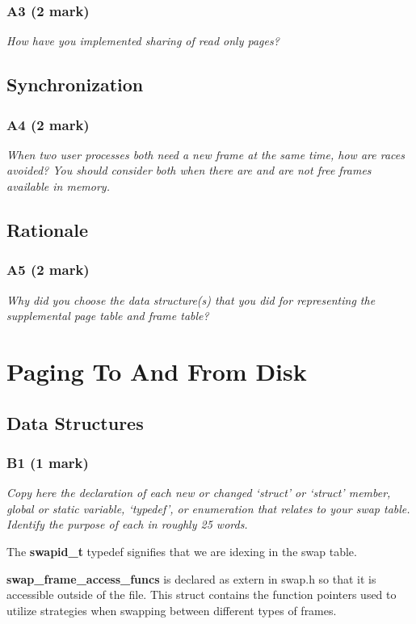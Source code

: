 \documentclass{report}
\newcommand{\question}[1]{\textit{#1} \ }
\newcommand{\file}[1]{\textcolor{YellowGreen}{\textbf{#1}}}
\newcommand{\var}[1]{\textcolor{RoyalPurple}{\textbf{#1}}}
\newcommand{\pintoscode}[4]{}
\newcommand{\pintosfile}[3]{\pintoscode{#1}{#2}{\file{#3}}{#3}}
\begin{document}
			\subsubsection*{A3 (2 mark)}
				\question{How have you implemented sharing of read only pages?}
			
		\subsection*{Synchronization}
			\subsubsection*{A4 (2 mark)}
				\question{When two user processes both need a new frame at 
				the same time, how are races avoided? You should consider both 
				when there are and are not free frames available in memory.}
			
		\subsection*{Rationale}
			\subsubsection*{A5 (2 mark)}
				\question{Why did you choose the data structure(s) that you did for 
				representing the supplemental page table and frame table?}
				
	\section*{Paging To And From Disk}
		\subsection*{Data Structures}
			\subsubsection*{B1 (1 mark)}
				\question{Copy here the declaration of each new or changed `struct' or
				`struct' member, global or static variable, `typedef', or enumeration 
				that relates to your swap table. Identify the purpose of each in roughly
				25 words.}
		
		\pintosfile{9}{9}{swap.h}
			The \var{swapid\_t} typedef signifies that we are idexing in the
			swap table.
		
		\pintosfile{11}{11}{swap.h}
			\var{swap\_frame\_access\_funcs} is declared as extern in swap.h so that it is
			accessible outside of the file. This struct contains the function pointers used to
		  utilize strategies when swapping between different types of frames.
\end{document}

